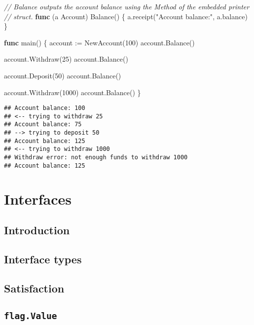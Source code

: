 \documentclass[]{book}
\newenvironment{Shaded}{\begin{snugshade}}{\end{snugshade}}
\newcommand{\CommentTok}[1]{\textcolor[rgb]{0.56,0.35,0.01}{\textit{#1}}}
\newcommand{\DecValTok}[1]{\textcolor[rgb]{0.00,0.00,0.81}{#1}}
\newcommand{\KeywordTok}[1]{\textcolor[rgb]{0.13,0.29,0.53}{\textbf{#1}}}
\newcommand{\NormalTok}[1]{#1}
\newcommand{\StringTok}[1]{\textcolor[rgb]{0.31,0.60,0.02}{#1}}
\begin{document}
\begin{Shaded}
\begin{Highlighting}[]
\CommentTok{// Balance outputs the account balance using the Method of the embedded printer}
\CommentTok{// struct.}
\KeywordTok{func}\NormalTok{ (a Account) Balance() \{}
\NormalTok{    a.receipt(}\StringTok{"Account balance:"}\NormalTok{, a.balance)}
\NormalTok{\}}

\KeywordTok{func}\NormalTok{ main() \{}
\NormalTok{    account := NewAccount(}\DecValTok{100}\NormalTok{)}
\NormalTok{    account.Balance()}

\NormalTok{    account.Withdraw(}\DecValTok{25}\NormalTok{)}
\NormalTok{    account.Balance()}

\NormalTok{    account.Deposit(}\DecValTok{50}\NormalTok{)}
\NormalTok{    account.Balance()}

\NormalTok{    account.Withdraw(}\DecValTok{1000}\NormalTok{)}
\NormalTok{    account.Balance()}
\NormalTok{\}}
\end{Highlighting}
\end{Shaded}

\begin{verbatim}
## Account balance: 100
## <-- trying to withdraw 25
## Account balance: 75
## --> trying to deposit 50
## Account balance: 125
## <-- trying to withdraw 1000
## Withdraw error: not enough funds to withdraw 1000
## Account balance: 125
\end{verbatim}

\hypertarget{interfaces}{%
\chapter{Interfaces}\label{interfaces}}

\hypertarget{introduction}{%
\section{Introduction}\label{introduction}}

\hypertarget{interface-types}{%
\section{Interface types}\label{interface-types}}

\hypertarget{satisfaction}{%
\section{Satisfaction}\label{satisfaction}}

\hypertarget{flag.value}{%
\section{\texorpdfstring{\texttt{flag.Value}}{flag.Value}}\label{flag.value}}
\end{document}
